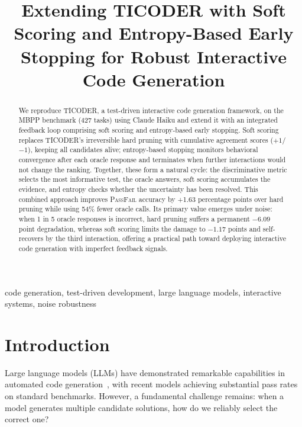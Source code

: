 \documentclass[conference]{IEEEtran}
\begin{document}
\title{Extending TICODER with Soft Scoring and Entropy-Based Early Stopping for Robust Interactive Code Generation}

\author{
}

\maketitle

\begin{abstract}
We reproduce TICODER, a test-driven interactive code generation framework, on the MBPP benchmark (427 tasks) using Claude Haiku and extend it with an integrated feedback loop comprising soft scoring and entropy-based early stopping. Soft scoring replaces TICODER's irreversible hard pruning with cumulative agreement scores ($+1$/$-1$), keeping all candidates alive; entropy-based stopping monitors behavioral convergence after each oracle response and terminates when further interactions would not change the ranking. Together, these form a natural cycle: the discriminative metric selects the most informative test, the oracle answers, soft scoring accumulates the evidence, and entropy checks whether the uncertainty has been resolved. This combined approach improves \textsc{PassFail} accuracy by +1.63 percentage points over hard pruning while using 54\% fewer oracle calls. Its primary value emerges under noise: when 1 in 5 oracle responses is incorrect, hard pruning suffers a permanent $-6.09$ point degradation, whereas soft scoring limits the damage to $-1.17$ points and self-recovers by the third interaction, offering a practical path toward deploying interactive code generation with imperfect feedback signals.
\end{abstract}

\begin{IEEEkeywords}
code generation, test-driven development, large language models, interactive systems, noise robustness
\end{IEEEkeywords}

\section{Introduction}

Large language models (LLMs) have demonstrated remarkable capabilities in automated code generation~\cite{chen2021codex, li2023starcoder, roziere2023codellama}, with recent models achieving substantial pass rates on standard benchmarks. However, a fundamental challenge remains: when a model generates multiple candidate solutions, how do we reliably select the correct one?
\end{document}
